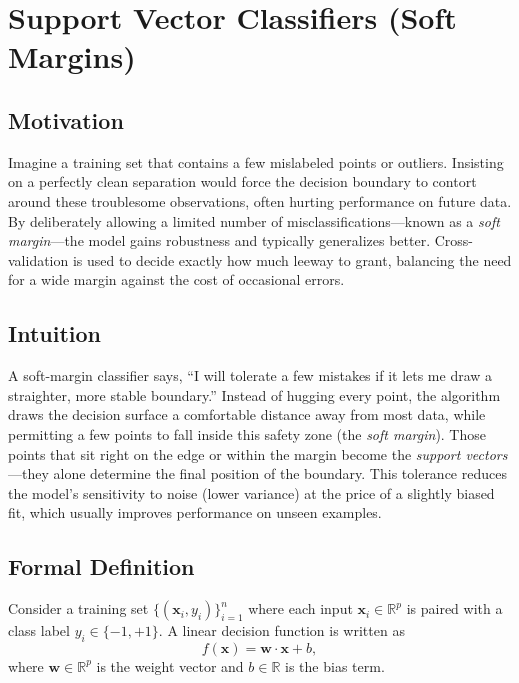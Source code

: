 \documentclass[12pt, a4paper]{article}
\begin{document}
\newpage

\section{Support Vector Classifiers (Soft Margins)}

\subsection{Motivation}
Imagine a training set that contains a few mislabeled points or outliers.  Insisting on a perfectly clean separation would force the decision boundary to contort around these troublesome observations, often hurting performance on future data.  By deliberately allowing a limited number of misclassifications---known as a \emph{soft margin}---the model gains robustness and typically generalizes better.  Cross-validation is used to decide exactly how much leeway to grant, balancing the need for a wide margin against the cost of occasional errors.

\subsection{Intuition}
A soft-margin classifier says, ``I will tolerate a few mistakes if it lets me draw a straighter, more stable boundary.''  Instead of hugging every point, the algorithm draws the decision surface a comfortable distance away from most data, while permitting a few points to fall inside this safety zone (the \emph{soft margin}).  Those points that sit right on the edge or within the margin become the \emph{support vectors}---they alone determine the final position of the boundary.  This tolerance reduces the model's sensitivity to noise (lower variance) at the price of a slightly biased fit, which usually improves performance on unseen examples.

\subsection{Formal Definition}
Consider a training set \(\{(\mathbf{x}_i, y_i)\}_{i=1}^{n}\) where each input \(\mathbf{x}_i\in\mathbb{R}^p\) is paired with a class label \(y_i\in\{-1,+1\}\).  
A linear decision function is written as  
\[
f(\mathbf{x}) = \mathbf{w}\!\cdot\!\mathbf{x} + b,
\]
where \(\mathbf{w}\in\mathbb{R}^p\) is the weight vector and \(b\in\mathbb{R}\) is the bias term.  
\end{document}
